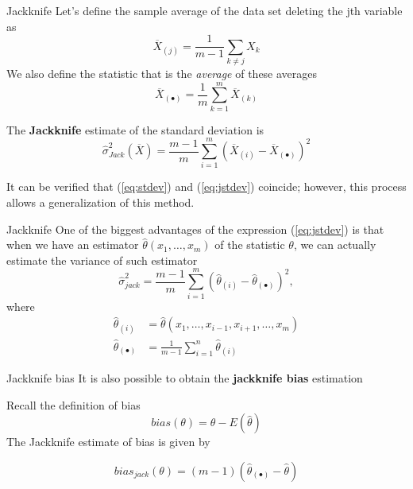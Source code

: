 \documentclass{beamer}
\begin{document}
\begin{frame}{Jackknife}
	Let's define the sample average of the data set deleting the jth variable as
	\begin{equation*}
		\overline{X}_{(j)}= \frac{1}{m-1} \sum_{k\ne j} X_k
	\end{equation*}
We also define the statistic that is the {\it average} of these averages
\begin{equation*}
	\overline{X}_{(\bullet)} = \frac{1}{m} \sum_{k=1}^m \overline{X}_{(k)}
\end{equation*}

The {\bf Jackknife} estimate of the standard deviation is
\begin{equation}
	\widehat{\sigma}_{Jack}^2(\overline{X})= \frac{m-1}{m} \sum_{i=1}^m (\overline{X}_{(i)} - \overline{X}_{(\bullet)})^2
\label{eq:jstdev}
\end{equation}

It can be verified that (\ref{eq:stdev}) and (\ref{eq:jstdev})  coincide; however, this process allows a generalization of this method.
\end{frame}

\begin{frame}{Jackknife}
	One of the biggest advantages of the expression (\ref{eq:jstdev}) is that when we  have an estimator $\hat{\theta}(x_1,\ldots, x_m)$ of the statistic $\theta$, we can actually estimate the variance of such estimator
	\begin{equation*}
		\hat{\sigma}_{jack}^2= \frac{m-1}{m} \sum_{i=1}^m (\hat{\theta}_{(i)}- \hat{\theta}_{(\bullet)})^2,
	\end{equation*}
where
\begin{equation*}
	\begin{split}
		\hat{\theta}_{(i)}&= \hat{\theta}(x_1, \ldots, x_{i-1},x_{i+1},\ldots, x_m) \\
		\hat{\theta}_{(\bullet)}&= \frac{1}{m-1} \sum_{i=1}^n \hat{\theta}_{(i)} 
	\end{split}
\end{equation*}

\end{frame}
		
\begin{frame}{Jackknife bias}
	It is also possible to obtain the {\bf jackknife bias} estimation
	
	Recall the definition of bias
	\begin{equation*}
		bias(\theta) = \theta - E(\hat{\theta})
	\end{equation*} 
The Jackknife estimate of bias is given by

\begin{equation*}
	bias_{jack} (\theta)= (m-1) (\hat{\theta}_{(\bullet)}- \hat{\theta})
\end{equation*}
\end{frame}		
		
\end{document}

